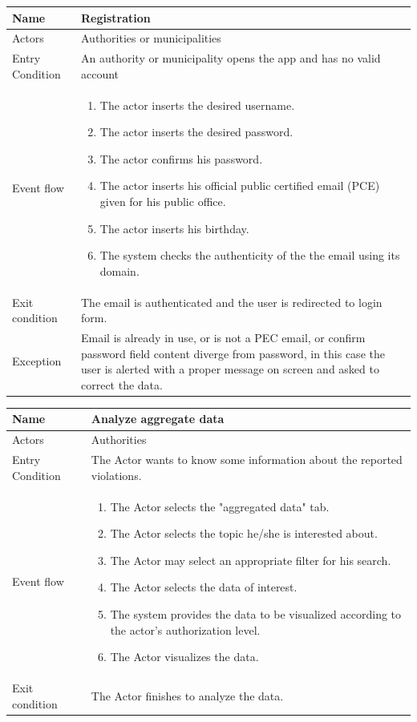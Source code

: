\vskip 0.2in
\begin{tabular}{|p{3.1cm}|p{11.6cm}|}
\hline
Name & Registration\\
\hline
Actors & Authorities or municipalities\\
\hline
Entry Condition & An authority or municipality opens the app and has no valid account\\
\hline
Event flow & \begin{enumerate}
                \item The actor inserts the desired username.
                \item The actor inserts the desired password.
                \item The actor confirms his password.
                \item The actor inserts his official public certified email (PCE) given for his public office.
                \item The actor inserts his birthday.
                \item The system checks the authenticity of the the email using its domain.
            \end{enumerate}\\
\hline
Exit condition & The email is authenticated and the user is redirected to login form.\\
\hline
Exception & Email is already in use, or is not a PEC email, or confirm password field content diverge from password, in this case the user is alerted with a proper message on screen and asked to correct the data.\\
\hline
\end{tabular}

\vskip 0.2in
\begin{tabular}{|p{3.1cm}|p{11.6cm}|}
\hline
Name & Analyze aggregate data\\
\hline
Actors & Authorities\\
\hline
Entry Condition & The Actor wants to know some information about the reported violations.\\
\hline
Event flow & \begin{enumerate}
                \item The Actor selects the "aggregated data" tab.
                \item The Actor selects the topic he/she is interested about.
                \item The Actor may select an appropriate filter for his search.
                \item The Actor selects the data of interest.
                \item The system provides the data to be visualized according to the actor's authorization level.
                \item The Actor visualizes the data.
            \end{enumerate}\\
\hline
Exit condition & The Actor finishes to analyze the data.\\
\hline
\end{tabular}

